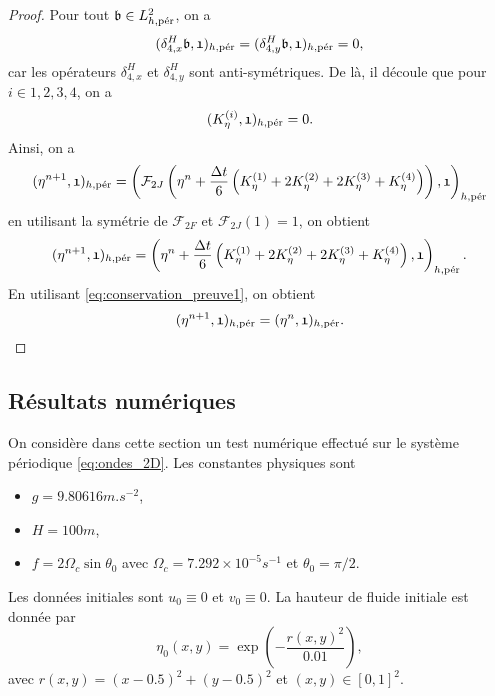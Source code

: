 \begin{proof}
Pour tout $\mathfrak{b} \in L^2_{h,\per}$, on a 
\begin{equation}
(\delta_{4,x}^H \mathfrak{b}, \mathfrak{1})_{h,\per} = (\delta_{4,y}^H \mathfrak{b}, \mathfrak{1})_{h,\per} = 0,
\end{equation}
car les opérateurs $\delta_{4,x}^H$ et $\delta_{4,y}^H$ sont anti-symétriques. De là, il découle que pour $i \in {1,2,3,4}$, on a 
\begin{equation}
(K_{\eta}^{(i)}, \mathfrak{1})_{h,\per} = 0.
\label{eq:conservation_preuve1}
\end{equation}
Ainsi, on a
\begin{equation}
(\etafrak^{n+1}, \mathfrak{1})_{h,\per} = \left( \mathcal{F}_{2J}\left( \etafrak^n  + \dfrac{\Delta t}{6} \left( K^{(1)}_{\eta} + 2 K^{(2)}_{\eta} + 2 K^{(3)}_{\eta} + K^{(4)}_{\eta} \right) \right) , \mathfrak{1} \right)_{h,\per}
\end{equation}
en utilisant la symétrie de $\mathcal{F}_{2F}$ et $\mathcal{F}_{2J}(\mathfrak{1}) = \mathfrak{1}$, on obtient
\begin{equation}
(\etafrak^{n+1}, \mathfrak{1})_{h,\per} = \left( \etafrak^n  + \dfrac{\Delta t}{6} \left( K^{(1)}_{\eta} + 2 K^{(2)}_{\eta} + 2 K^{(3)}_{\eta} + K^{(4)}_{\eta} \right) , \mathfrak{1}\right)_{h,\per}.
\end{equation}
En utilisant \eqref{eq:conservation_preuve1}, on obtient
\begin{equation}
(\etafrak^{n+1} , \mathfrak{1})_{h,\per} = (\etafrak^{n} , \mathfrak{1})_{h,\per}.
\end{equation}
\end{proof}









\subsection{Résultats numériques}

On considère dans cette section un test numérique effectué sur le système périodique \eqref{eq:ondes_2D}. Les constantes physiques sont
\begin{itemize}
\item $g = 9.80616 \si{m.s^{-2}}$,
\item $H=100 \si{m}$,
\item $f = 2 \Omega_c \sin \theta_0$ avec $\Omega_c = 7.292 \times 10^{-5} \si{s^{-1}}$ et $\theta_0 = \pi/2$.
\end{itemize}
Les données initiales sont $u_0 \equiv 0$ et $v_0 \equiv 0$. La hauteur de fluide initiale est donnée par
\begin{equation}
\eta_0(x,y) = \exp \left( - \dfrac{r(x,y)^2}{0.01} \right),
\label{eq:waves_test1}
\end{equation}
avec $r(x,y) = (x-0.5)^2+(y-0.5)^2$ et $(x,y) \in [0,1]^2$.

